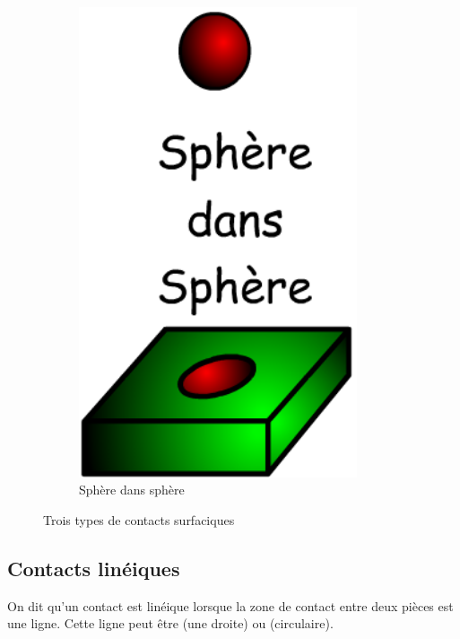 \documentclass[10pt,fleqn,draft]{article} %
\begin{document}
\begin{figure}[h]
\begin{subfigure}[b]{0.3\textwidth}
    \includegraphics[width=0.9\textwidth,height=.15\textheight,keepaspectratio]{images/surface_sphere}
    \caption{Sphère dans sphère}
  \end{subfigure}\hfill
  \caption{Trois types de contacts surfaciques}
  \label{fig:surfacique}
\end{figure}

\subsection{Contacts linéiques}
\begin{defi}
  On dit qu'un contact est linéique lorsque la zone de contact entre deux pièces est une ligne. Cette ligne peut être  (une droite) ou  (circulaire).
\end{defi}
\end{document}
